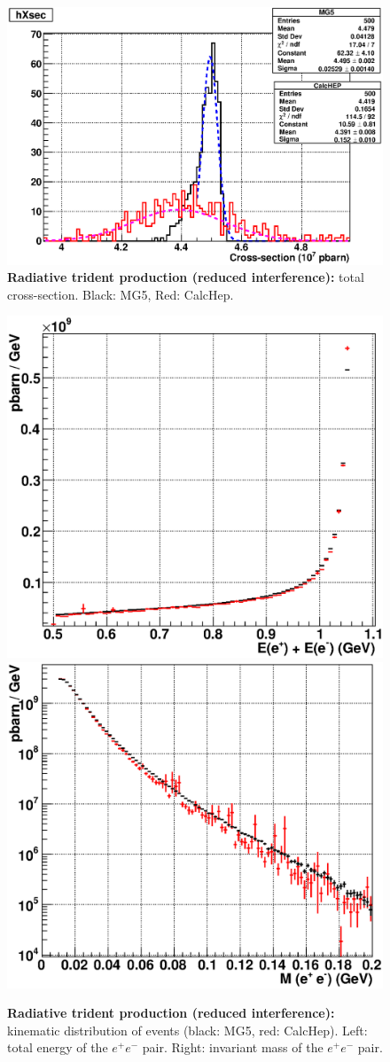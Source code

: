 \documentclass{article}
\begin{document}
\begin{figure}[tpb]
\centering
\includegraphics[width=.8\textwidth]{img/RAD_xsec.eps}
\caption{\label{fig:rad-xsec} \textbf{Radiative trident production (reduced interference):} total cross-section. Black: MG5, Red: CalcHep.}
\end{figure}

\begin{figure}[tpb]
\centering
\includegraphics[width=.48\textwidth]{img/RAD_esum.eps}
\includegraphics[width=.48\textwidth]{img/RAD_mass.eps}
\caption{\label{fig:rad-kin} \textbf{Radiative trident production (reduced interference):} kinematic distribution of events (black: MG5, red: CalcHep). Left: total energy of the $e^+ e^-$ pair. Right: invariant mass of the $e^+ e^-$ pair.}
\end{figure}
\end{document}
